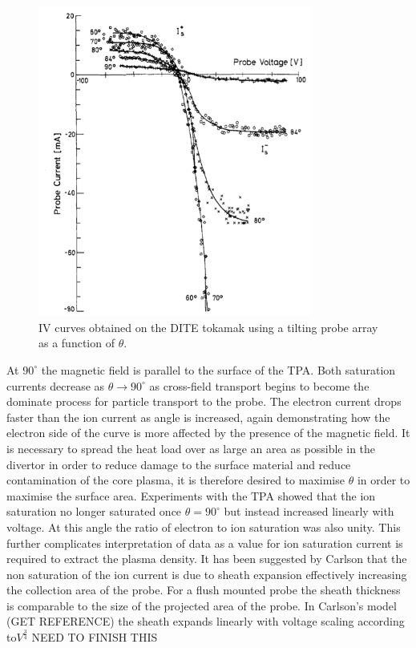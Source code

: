 \documentclass[12pt]{article}
\begin{document}
\begin{figure}[H]
\centering
\includegraphics[width=0.8\textwidth]{lpangle}
\caption{IV curves obtained on the DITE tokamak using a tilting probe array as a function of $\theta$.  \cite{tilting}}
\label{fig:angle}
\end{figure}
At $90^{\circ}$ the magnetic field is parallel to the surface of the TPA. Both saturation currents decrease as $\theta \to 90^{\circ}$ as cross-field transport begins to become the dominate process for particle transport to the probe. The electron current drops faster than the ion current as angle is increased, again demonstrating how the electron side of the curve is more affected by the presence of the magnetic field. It is necessary to spread the heat load over as large an area as possible in the divertor in order to reduce damage to the surface material and reduce contamination of the core plasma, it is therefore desired to maximise $\theta$ in order to  maximise the surface area. Experiments with the TPA showed that the ion saturation no longer saturated once $\theta = 90 ^{\circ}$ but instead increased linearly with voltage. At this angle the ratio of electron to ion saturation was also unity. This further complicates interpretation of data as a value for ion saturation current is required to extract the plasma density. It has been suggested by Carlson that the non saturation of the ion current is due to sheath expansion effectively increasing the collection area of the probe. For a flush mounted probe the sheath thickness is comparable to the size of the projected area of the probe. In Carlson's model (GET REFERENCE) the sheath expands linearly with voltage scaling according to$V^{\frac{3}{4}}$ 
NEED TO FINISH THIS
\end{document}
